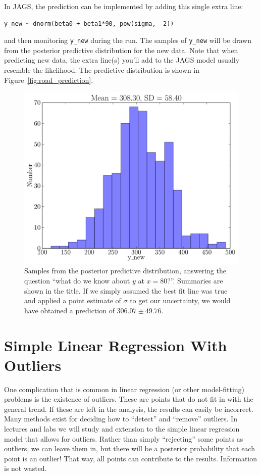 In JAGS, the prediction can be implemented by adding this single extra line:
\begin{framed}
\begin{verbatim}
y_new ~ dnorm(beta0 + beta1*90, pow(sigma, -2))
\end{verbatim}
\end{framed}
and then monitoring {\tt y\_new} during the run. The samples of {\tt y\_new}
will be drawn from the posterior predictive distribution for the new data.
Note that when predicting new data, the extra line(s) you'll add to the JAGS
model usually resemble the likelihood. The predictive distribution is shown in
Figure~\ref{fig:road_prediction}.
\begin{figure}[ht!]
\begin{center}
\includegraphics[scale=0.5]{Figures/road_prediction.pdf}
\caption{Samples from the posterior predictive distribution, answering the
question ``what do we know about $y$ at $x=80$?''. Summaries are shown in
the title. If we simply assumed the best fit line was true and applied a
point estimate of $\sigma$ to get our uncertainty, we would have obtained a
prediction of $306.07 \pm 49.76$.}
\end{center}
\end{figure}

\section{Simple Linear Regression With Outliers}
One complication that is common in linear regression (or other model-fitting)
problems is the existence of outliers. These are points that do not fit in with
the general trend. If these are left in the analysis, the results can easily
be incorrect. Many methods exist for deciding how to ``detect'' and ``remove''
outliers. In lectures and labs we will study and extension to the simple linear
regression model that allows for outliers. Rather than simply ``rejecting'' some
points as outliers, we can leave them in, but there will be a posterior probability
that each point is an outlier! That way, all points can contribute to the results.
Information is not wasted.

